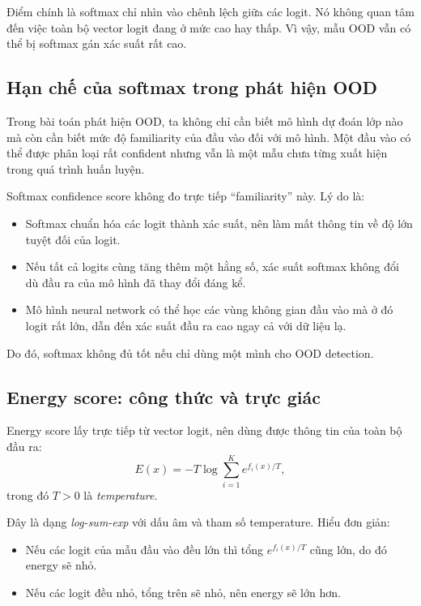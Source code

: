 \documentclass[12pt,a4paper]{article}
\begin{document}
Điểm chính là softmax chỉ nhìn vào chênh lệch giữa các logit. Nó không quan tâm đến việc toàn bộ vector logit đang ở mức cao hay thấp. Vì vậy, mẫu OOD vẫn có thể bị softmax gán xác suất rất cao.

\subsection{Hạn chế của softmax trong phát hiện OOD}

Trong bài toán phát hiện OOD, ta không chỉ cần biết mô hình dự đoán lớp nào mà còn cần biết mức độ familiarity của đầu vào đối với mô hình. Một đầu vào có thể được phân loại rất confident nhưng vẫn là một mẫu chưa từng xuất hiện trong quá trình huấn luyện.

Softmax confidence score không đo trực tiếp ``familiarity'' này. Lý do là:

\begin{itemize}
  \item Softmax chuẩn hóa các logit thành xác suất, nên làm mất thông tin về độ lớn tuyệt đối của logit.
  \item Nếu tất cả logits cùng tăng thêm một hằng số, xác suất softmax không đổi dù đầu ra của mô hình đã thay đổi đáng kể.
  \item Mô hình neural network có thể học các vùng không gian đầu vào mà ở đó logit rất lớn, dẫn đến xác suất đầu ra cao ngay cả với dữ liệu lạ.
\end{itemize}

Do đó, softmax không đủ tốt nếu chỉ dùng một mình cho OOD detection.

\subsection{Energy score: công thức và trực giác}

Energy score lấy trực tiếp từ vector logit, nên dùng được thông tin của toàn bộ đầu ra:
\[
E(x) = -T \log \sum_{i=1}^{K} e^{f_i(x)/T},
\]
trong đó $T>0$ là \textit{temperature}.

Đây là dạng \textit{log-sum-exp} với dấu âm và tham số temperature. Hiểu đơn giản:

\begin{itemize}
  \item Nếu các logit của mẫu đầu vào đều lớn thì tổng $e^{f_i(x)/T}$ cũng lớn, do đó energy sẽ nhỏ.
  \item Nếu các logit đều nhỏ, tổng trên sẽ nhỏ, nên energy sẽ lớn hơn.
\end{itemize}
\end{document}
